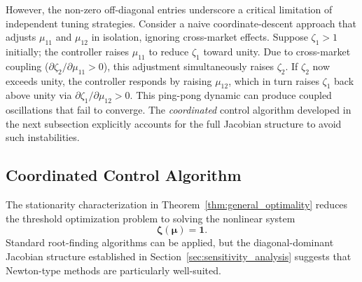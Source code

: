 However, the non-zero off-diagonal entries underscore a critical limitation of independent tuning strategies.
Consider a naive coordinate-descent approach that adjusts $\mu_{11}$ and $\mu_{12}$ in isolation, ignoring cross-market effects.
Suppose $\zeta_1 > 1$ initially; the controller raises $\mu_{11}$ to reduce $\zeta_1$ toward unity.
Due to cross-market coupling ($\partial \zeta_2 / \partial \mu_{11} > 0$), this adjustment simultaneously raises $\zeta_2$.
If $\zeta_2$ now exceeds unity, the controller responds by raising $\mu_{12}$, which in turn raises $\zeta_1$ back above unity via $\partial \zeta_1 / \partial \mu_{12} > 0$.
This ping-pong dynamic can produce coupled oscillations that fail to converge.
The \emph{coordinated} control algorithm developed in the next subsection explicitly accounts for the full Jacobian structure to avoid such instabilities.

\subsection{Coordinated Control Algorithm}
\label{subsec:coordinated_control}

The stationarity characterization in Theorem~\ref{thm:general_optimality} reduces the threshold optimization problem to solving the nonlinear system
\begin{equation*}
  \boldsymbol{\zeta}(\boldsymbol{\mu}) = \mathbf{1}.
\end{equation*}
Standard root-finding algorithms can be applied, but the diagonal-dominant Jacobian structure established in Section~\ref{sec:sensitivity_analysis} suggests that Newton-type methods are particularly well-suited.

